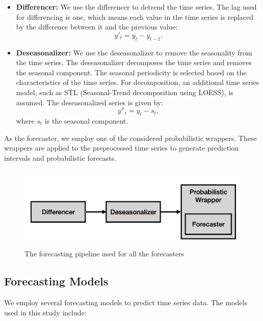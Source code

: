 \documentclass{article}
\begin{document}
\begin{itemize}
    \item \textbf{Differencer:} We use the differencer to detrend the time series. The lag used for differencing is one, which means each value in the time series is replaced by the difference between it and the previous value:
    \begin{equation}
        y'_t = y_t - y_{t-1}.
    \end{equation}
    \item \textbf{Deseasonalizer:} We use the deseasonalizer to remove the seasonality from the time series. The deseasonalizer decomposes the time series and removes the seasonal component. The seasonal periodicity is selected based on the characteristics of the time series. For decomposition, an additional time series model, such as STL (Seasonal-Trend decomposition using LOESS), is assumed. The deseasonalized series is given by:
    \begin{equation}
        y''_t = y_t - s_t,
    \end{equation}
    where \( s_t \) is the seasonal component.
\end{itemize}

As the forecaster, we employ one of the considered probabilistic wrappers. These wrappers are applied to the preprocessed time series to generate prediction intervals and probabilistic forecasts.

\begin{figure}
    \centering
    \includegraphics[width=\textwidth]{Figures/Pipeline.png}
    \caption{The forecasting pipeline used for all the forecasters}
    \label{fig:pipeline}
\end{figure}

\subsection{Forecasting Models}
We employ several forecasting models to predict time series data. The models used in this study include:
\end{document}
